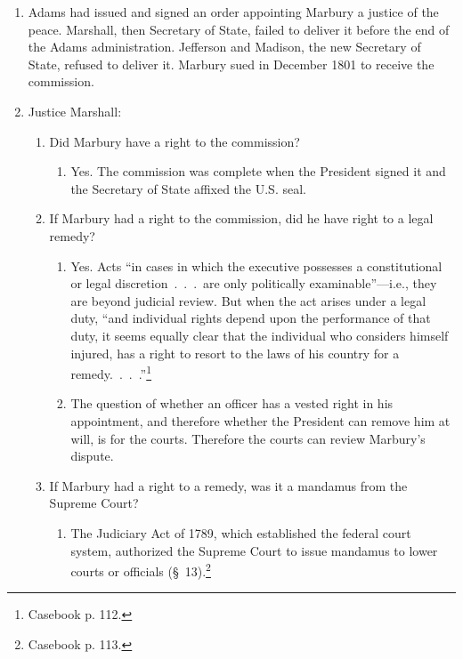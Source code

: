 \begin{enumerate}
    \item Adams had issued and signed an order appointing Marbury a justice of 
    the peace.  Marshall, then Secretary of State, failed to deliver it before 
    the end of the Adams administration. Jefferson and Madison, the new 
    Secretary of State, refused to deliver it. Marbury sued in December 1801 
    to receive the commission.
    \item Justice Marshall:
    \begin{enumerate}
        \item Did Marbury have a right to the commission?
        \begin{enumerate}
            \item Yes. The commission was complete when the President signed 
            it and the Secretary of State affixed the U.S. seal.
        \end{enumerate}
        \item If Marbury had a right to the commission, did he have right to a 
        legal remedy?
        \begin{enumerate}
            \item Yes. Acts ``in cases in which the executive possesses a 
            constitutional or legal discretion~.~.~.~are only politically 
            examinable''---i.e., they are beyond judicial review. But when the 
            act arises under a legal duty, ``and individual rights depend upon 
            the performance of that duty, it seems equally clear that the 
            individual who considers himself injured, has a right to resort to 
            the laws of his country for a remedy.~.~.~.''\footnote{Casebook p.  
            112.} 
            \item The question of whether an officer has a vested right in his 
            appointment, and therefore whether the President can remove him at 
            will, is for the courts. Therefore the courts can review Marbury's 
            dispute.
        \end{enumerate}
        \item If Marbury had a right to a remedy, was it a mandamus from the 
        Supreme Court?
        \begin{enumerate}
            \item The Judiciary Act of 1789, which established the federal 
            court system, authorized the Supreme Court to issue mandamus to 
            lower courts or officials (\S\ 13).\footnote{Casebook p. 113.}

\end{enumerate}
\end{enumerate}
\end{enumerate}
